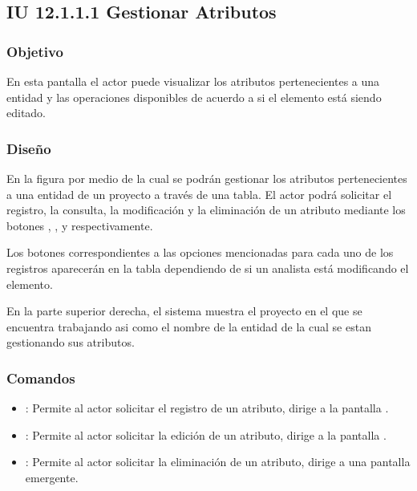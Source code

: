 \subsection{IU 12.1.1.1 Gestionar Atributos}

\subsubsection{Objetivo}
	En esta pantalla el actor puede visualizar los atributos pertenecientes a una entidad y las operaciones disponibles de acuerdo a si el elemento está siendo editado.
\subsubsection{Diseño}
	En la figura  por medio de la cual se podrán gestionar los atributos pertenecientes a una entidad de un proyecto a través de una tabla. El actor podrá solicitar el registro, la consulta, la modificación y la eliminación de un atributo mediante los botones , , \editar y \eliminar respectivamente.
	
	Los botones correspondientes a las opciones mencionadas para cada uno de los registros aparecerán en la tabla dependiendo de si un analista está modificando el elemento.
	
	En la parte superior derecha, el sistema muestra el proyecto en el que se encuentra trabajando asi como el nombre de la entidad de la cual se estan gestionando sus atributos.

\subsubsection{Comandos}
\begin{itemize}
	\item {}: Permite al actor solicitar el registro de un atributo, dirige a la pantalla .
	\item \editar [Modificar]: Permite al actor solicitar la edición de un atributo, dirige a la pantalla .
	\item \eliminar [Eliminar]: Permite al actor solicitar la eliminación de un atributo, dirige a una pantalla emergente.
\end{itemize}
